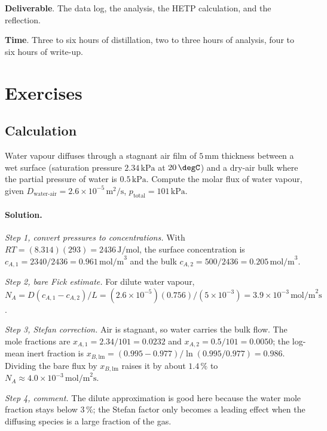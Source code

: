 \begin{project}
\textbf{Deliverable}. The data log, the analysis, the HETP
calculation, and the reflection.

\textbf{Time}. Three to six hours of distillation, two to three hours
of analysis, four to six hours of write-up.
\end{project}

\section{Exercises}

\subsection*{Calculation}

\begin{exercise}
Water vapour diffuses through a stagnant air film of $5\,\si{\milli
\meter}$ thickness between a wet surface (saturation pressure
$2.34\,\text{kPa}$ at $20\,\degC$) and a dry-air bulk where the
partial pressure of water is $0.5\,\text{kPa}$. Compute the molar
flux of water vapour, given $D_{\text{water-air}} = 2.6 \times
10^{-5}\,\text{m}^2/\text{s}$, $p_{\text{total}} = 101\,\text{kPa}$.

\paragraph{Solution.}
\textit{Step 1, convert pressures to concentrations.} With $RT =
(8.314)(293) = 2436\,\text{J/mol}$, the surface concentration is
$c_{A,1} = 2340/2436 = 0.961\,\text{mol/m}^3$ and the bulk
$c_{A,2} = 500/2436 = 0.205\,\text{mol/m}^3$.

\textit{Step 2, bare Fick estimate.} For dilute water vapour,
$N_A = D(c_{A,1}-c_{A,2})/L = (2.6\times 10^{-5})(0.756)/(5\times
10^{-3}) = 3.9\times 10^{-3}\,\text{mol/m}^2\text{s}$.

\textit{Step 3, Stefan correction.} Air is stagnant, so water carries
the bulk flow. The mole fractions are $x_{A,1} = 2.34/101 = 0.0232$
and $x_{A,2} = 0.5/101 = 0.0050$; the log-mean inert fraction is
$x_{B,\text{lm}} = (0.995-0.977)/\ln(0.995/0.977) = 0.986$. Dividing
the bare flux by $x_{B,\text{lm}}$ raises it by about $1.4\,\%$ to
$N_A \approx 4.0\times 10^{-3}\,\text{mol/m}^2\text{s}$.

\textit{Step 4, comment.} The dilute approximation is good here
because the water mole fraction stays below $3\,\%$; the Stefan factor
only becomes a leading effect when the diffusing species is a large
fraction of the gas.
\end{exercise}

